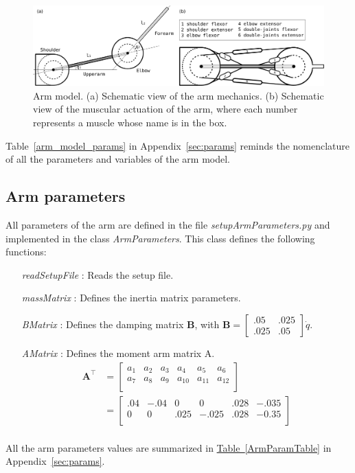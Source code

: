 \documentclass[pdftex,a4paper,12pt]{report}
\begin{document}
\begin{figure}[hbt]
\centering
	\includegraphics[width=0.9\columnwidth]{figures/arm_model_horiz.pdf}
	\caption{Arm model. (a) Schematic view of the arm mechanics. (b) Schematic view of the muscular actuation of the arm, where each number represents a muscle whose name is in the box.}
	\label{fig:arm_model}
\end{figure}

Table~\ref{arm_model_params} in Appendix~\ref{sec:params} reminds the nomenclature of all the parameters and variables of the arm model. 

\subsection{Arm parameters}
\label{sec:arm_parameters}
All parameters of the arm are defined in the file \textit{setupArmParameters.py} and implemented in the class \textit{ArmParameters}.
This class defines the following functions:
\begin{itemize}
\item[\textit{readSetupFile}]: Reads the setup file.
\item[\textit{massMatrix}]: Defines the inertia matrix parameters.
\item[\textit{BMatrix}]: Defines the damping matrix \textbf{B}, with
$\textbf{B} = \begin{bmatrix}
           .05 & .025 \\
          .025 & .05
     \end{bmatrix} \dot{q}.$\\
\item[\textit{AMatrix}]: Defines the moment arm matrix A.
\begin{align*}
  \textbf{A}^\top        & = \begin{bmatrix}
    a_{1} & a_{2} & a_{3} & a_{4} & a_{5} & a_{6} \\
    a_{7} & a_{8} & a_{9} & a_{10} & a_{11} & a_{12} \\
  \end{bmatrix} \\
  & = \begin{bmatrix}
    .04 & -.04 &    0 &     0 & .028 & -.035 \\
    0 &    0 & .025 & -.025 & .028 & -0.35 \\
  \end{bmatrix}\\
\end{align*}
\end{itemize}
All the arm parameters values are summarized in \hyperref[ArmParamTable]{Table~\ref{ArmParamTable}} in Appendix~\ref{sec:params}.
\end{document}
